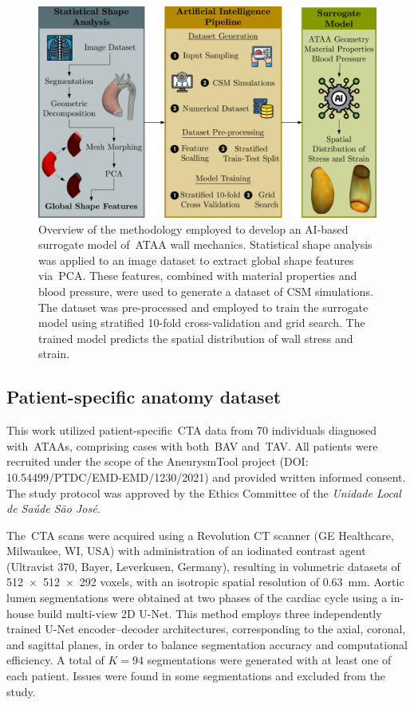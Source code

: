 \documentclass[a4paper,fleqn]{cas-sc}
\begin{document}
\begin{figure}
  \centering
  \includegraphics[width=\textwidth]{fig1}
  \caption{Overview of the methodology employed to develop an AI-based surrogate model of~\gls{ATAA} wall mechanics. Statistical shape analysis was applied to an image dataset to extract global shape features via~\gls{PCA}. These features, combined with material properties and blood pressure, were used to generate a dataset of CSM simulations. The dataset was pre-processed and employed to train the surrogate model using stratified 10-fold cross-validation and grid search. The trained model predicts the spatial distribution of wall stress and strain.}
  \label{fig:workflow}
\end{figure}

\subsection{Patient-specific anatomy dataset}
  This work utilized patient-specific~\gls{CTA} data from 70 individuals diagnosed with~\glspl{ATAA}, comprising cases with both~\gls{BAV} and~\gls{TAV}. All patients were recruited under the scope of the AneurysmTool project (DOI: 10.54499/PTDC/EMD-EMD/1230/2021) and provided written informed consent. The study protocol was approved by the Ethics Committee of the \textit{Unidade Local de Saúde São José}.

  The~\gls{CTA} scans were acquired using a Revolution CT scanner (GE Healthcare, Milwaukee, WI, USA) with administration of an iodinated contrast agent (Ultravist 370, Bayer, Leverkusen, Germany), resulting in volumetric datasets of 512~$\times$~512~$\times$~292 voxels, with an isotropic spatial resolution of 0.63~\si{\milli\meter}. Aortic lumen segmentations were obtained at two phases of the cardiac cycle using a in-house build multi-view 2D U-Net. This method employs three independently trained U-Net encoder–decoder architectures, corresponding to the axial, coronal, and sagittal planes, in order to balance segmentation accuracy and computational efficiency. A total of $K=94$ segmentations were generated with at least one of each patient. Issues were found in some segmentations and excluded from the study.
\end{document}
